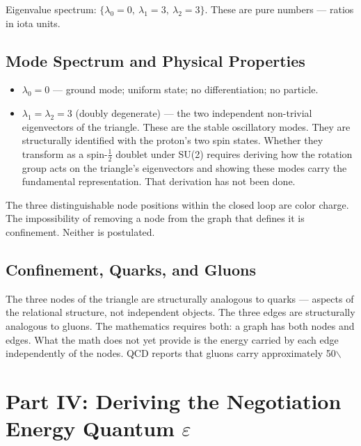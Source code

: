 \documentclass[11pt,letterpaper]{article}
\begin{document}
Eigenvalue spectrum: \(\{\lambda_0 = 0,\ \lambda_1 = 3,\ \lambda_2 = 3\}\). These are pure numbers --- ratios in iota units.

\subsection{Mode Spectrum and Physical Properties}
\label{sec:org9df911a}

\begin{itemize}
\item \(\lambda_0 = 0\) --- ground mode; uniform state; no differentiation; no particle.
\item \(\lambda_1 = \lambda_2 = 3\) (doubly degenerate) --- the two independent non-trivial eigenvectors of the triangle. These are the stable oscillatory modes. They are structurally identified with the proton's two spin states. Whether they transform as a spin-\(\tfrac{1}{2}\) doublet under SU(2) requires deriving how the rotation group acts on the triangle's eigenvectors and showing these modes carry the fundamental representation. That derivation has not been done.
\end{itemize}

The three distinguishable node positions within the closed loop are color charge. The impossibility of removing a node from the graph that defines it is confinement. Neither is postulated.

\subsection{Confinement, Quarks, and Gluons}
\label{sec:orgb1e5f03}

The three nodes of the triangle are structurally analogous to quarks --- aspects of the relational structure, not independent objects. The three edges are structurally analogous to gluons. The mathematics requires both: a graph has both nodes and edges. What the math does not yet provide is the energy carried by each edge independently of the nodes. QCD reports that gluons carry approximately 50$\backslash$%

\section{Part IV: Deriving the Negotiation Energy Quantum \(\varepsilon\)}
\label{sec:orgfe3e43b}
\end{document}
